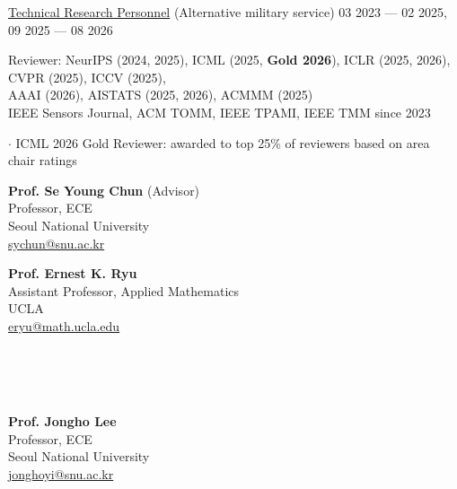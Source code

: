 \begin{cvcontent}
\href{https://elaw.klri.re.kr/kor_service/jomunPrint.do?hseq=10572&cseq=235795}{Technical Research Personnel} (Alternative military service)
\hfill 03 2023 --- 02 2025, 09 2025 --- 08 2026

Reviewer: NeurIPS (2024, 2025), ICML (2025, \textbf{Gold 2026}), ICLR (2025, 2026), CVPR (2025), ICCV (2025), \\ AAAI (2026), AISTATS (2025, 2026), ACMMM (2025)\\ IEEE Sensors Journal, ACM TOMM, IEEE TPAMI, IEEE TMM \hfill since 2023

{\small $\cdot$ ICML 2026 Gold Reviewer: awarded to top 25\% of reviewers based on area chair ratings}

\end{cvcontent}
\begin{cvcontent}
    \begin{minipage}[t]{0.5\textwidth}
        \textbf{Prof. Se Young Chun} (Advisor)\\
        Professor, ECE\\
        Seoul National University\\
        \href{mailto:sychun@snu.ac.kr}{sychun@snu.ac.kr}
    \end{minipage}
    \begin{minipage}[t]{0.5\textwidth}
        \textbf{Prof. Ernest K. Ryu}\\
        Assistant Professor, Applied Mathematics\\
        UCLA\\
        \href{mailto:eryu@math.ucla.edu}{eryu@math.ucla.edu}
    \end{minipage}
    \\
    \\
    \\
    \begin{minipage}[t]{0.5\textwidth}
        \textbf{Prof. Jongho Lee}\\
        Professor, ECE\\
        Seoul National University\\
        \href{mailto:jonghoyi@snu.ac.kr}{jonghoyi@snu.ac.kr}
    \end{minipage}
\end{cvcontent}
